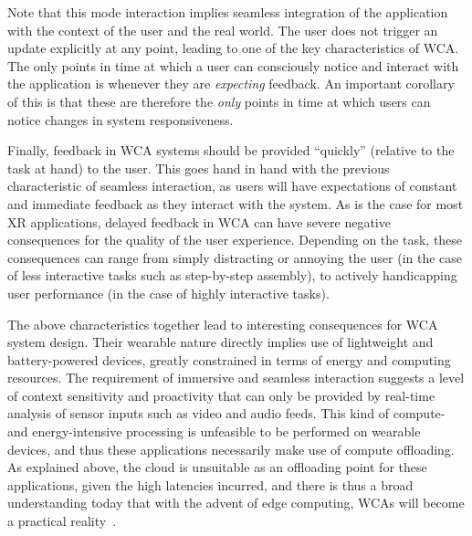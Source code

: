Note that this mode interaction implies seamless integration of the application with the context of the user and the real world.
The user does not trigger an update explicitly at any point, leading to one of the key characteristics of \gls{WCA}.
The only points in time at which a user can consciously notice and interact with the application is whenever they are \emph{expecting} feedback.
An important corollary of this is that these are therefore the \emph{only} points in time at which users can notice changes in system responsiveness.

Finally, feedback in \gls{WCA} systems should be provided ``quickly'' (relative to the task at hand) to the user.
This goes hand in hand with the previous characteristic of seamless interaction, as users will have expectations of constant and immediate feedback as they interact with the system.
As is the case for most \gls{XR} applications, delayed feedback in \gls{WCA} can have severe negative consequences for the quality of the user experience.
Depending on the task, these consequences can range from simply distracting or annoying the user (in the case of less interactive tasks such as step-by-step assembly), to actively handicapping user performance (in the case of highly interactive tasks).

The above characteristics together lead to interesting consequences for \gls{WCA} system design.
Their wearable nature directly implies use of lightweight and battery-powered devices, greatly constrained in terms of energy and computing resources.
The requirement of immersive and seamless interaction suggests a level of context sensitivity and proactivity that can only be provided by real-time analysis of sensor inputs such as video and audio feeds.
This kind of compute- and energy-intensive processing is unfeasible to be performed on wearable devices, and thus these applications necessarily make use of compute offloading.
As explained above, the cloud is unsuitable as an offloading point for these applications, given the high latencies incurred, and there is thus a broad understanding today that with the advent of edge computing, \glspl{WCA} will become a practical reality~\cite{bittmann2017edge,flinn2012cyber,chen2017empirical,ha2013just,wang2020scaling,chen2018application,ha2014towards}.

